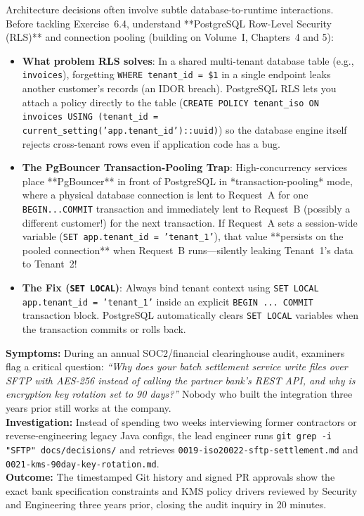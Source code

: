 Architecture decisions often involve subtle database-to-runtime interactions. Before tackling Exercise~6.4, understand **PostgreSQL Row-Level Security (RLS)** and connection pooling (building on Volume~I, Chapters~4 and 5):
\begin{itemize}[leftmargin=18pt]
  \item \textbf{What problem RLS solves}: In a shared multi-tenant database table (e.g., \texttt{invoices}), forgetting \texttt{WHERE tenant\_id = \$1} in a single endpoint leaks another customer's records (an IDOR breach). PostgreSQL RLS lets you attach a policy directly to the table (\texttt{CREATE POLICY tenant\_iso ON invoices USING (tenant\_id = current\_setting('app.tenant\_id')::uuid)}) so the database engine itself rejects cross-tenant rows even if application code has a bug.
  \item \textbf{The PgBouncer Transaction-Pooling Trap}: High-concurrency services place **PgBouncer** in front of PostgreSQL in *transaction-pooling* mode, where a physical database connection is lent to Request~A for one \texttt{BEGIN...COMMIT} transaction and immediately lent to Request~B (possibly a different customer!) for the next transaction. If Request~A sets a session-wide variable (\texttt{SET app.tenant\_id = 'tenant\_1'}), that value **persists on the pooled connection** when Request~B runs---silently leaking Tenant~1's data to Tenant~2!
  \item \textbf{The Fix (\texttt{SET LOCAL})}: Always bind tenant context using \texttt{SET LOCAL app.tenant\_id = 'tenant\_1'} inside an explicit \texttt{BEGIN ... COMMIT} transaction block. PostgreSQL automatically clears \texttt{SET LOCAL} variables when the transaction commits or rolls back.
\end{itemize}

\begin{realworldbox}
\textbf{Symptoms:} During an annual SOC2/financial clearinghouse audit, examiners flag a critical question: \textit{``Why does your batch settlement service write files over SFTP with AES-256 instead of calling the partner bank's REST API, and why is encryption key rotation set to 90 days?''} Nobody who built the integration three years prior still works at the company.\\
\textbf{Investigation:} Instead of spending two weeks interviewing former contractors or reverse-engineering legacy Java configs, the lead engineer runs \texttt{git grep -i "SFTP" docs/decisions/} and retrieves \texttt{0019-iso20022-sftp-settlement.md} and \texttt{0021-kms-90day-key-rotation.md}.\\
\textbf{Outcome:} The timestamped Git history and signed PR approvals show the exact bank specification constraints and KMS policy drivers reviewed by Security and Engineering three years prior, closing the audit inquiry in 20 minutes.
\end{realworldbox}

